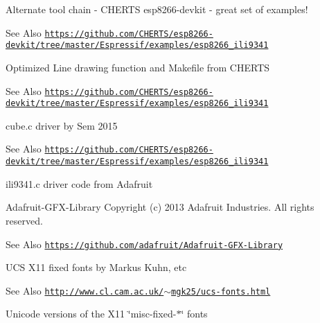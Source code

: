  \begin{DoxyParagraph}{Alternate tool chain -\/ C\-H\-E\-R\-T\-S esp8266-\/devkit -\/ great set of examples!}

\end{DoxyParagraph}
\begin{DoxySeeAlso}{See Also}
\href{https://github.com/CHERTS/esp8266-devkit/tree/master/Espressif/examples/esp8266_ili9341}{\tt https\-://github.\-com/\-C\-H\-E\-R\-T\-S/esp8266-\/devkit/tree/master/\-Espressif/examples/esp8266\-\_\-ili9341}
\end{DoxySeeAlso}


 \begin{DoxyParagraph}{Optimized Line drawing function and Makefile from C\-H\-E\-R\-T\-S}

\end{DoxyParagraph}
\begin{DoxySeeAlso}{See Also}
\href{https://github.com/CHERTS/esp8266-devkit/tree/master/Espressif/examples/esp8266_ili9341}{\tt https\-://github.\-com/\-C\-H\-E\-R\-T\-S/esp8266-\/devkit/tree/master/\-Espressif/examples/esp8266\-\_\-ili9341}
\end{DoxySeeAlso}


 \begin{DoxyParagraph}{cube.c driver by Sem 2015}

\end{DoxyParagraph}
\begin{DoxySeeAlso}{See Also}
\href{https://github.com/CHERTS/esp8266-devkit/tree/master/Espressif/examples/esp8266_ili9341}{\tt https\-://github.\-com/\-C\-H\-E\-R\-T\-S/esp8266-\/devkit/tree/master/\-Espressif/examples/esp8266\-\_\-ili9341}
\end{DoxySeeAlso}


 \begin{DoxyParagraph}{ili9341.c driver code from Adafruit}

\end{DoxyParagraph}
\begin{DoxyParagraph}{Adafruit-\/\-G\-F\-X-\/\-Library Copyright (c) 2013 Adafruit Industries. }
All rights reserved. 
\end{DoxyParagraph}
\begin{DoxySeeAlso}{See Also}
\href{https://github.com/adafruit/Adafruit-GFX-Library}{\tt https\-://github.\-com/adafruit/\-Adafruit-\/\-G\-F\-X-\/\-Library} 

 
\end{DoxySeeAlso}
\begin{DoxyParagraph}{U\-C\-S X11 fixed fonts by Markus Kuhn, etc}

\end{DoxyParagraph}
\begin{DoxySeeAlso}{See Also}
\href{http://www.cl.cam.ac.uk/~mgk25/ucs-fonts.html}{\tt http\-://www.\-cl.\-cam.\-ac.\-uk/$\sim$mgk25/ucs-\/fonts.\-html}
\begin{DoxyItemize}
\item Unicode versions of the X11 \char`\"{}misc-\/fixed-\/$\ast$\char`\"{} fonts
\end{DoxyItemize}
\end{DoxySeeAlso}


